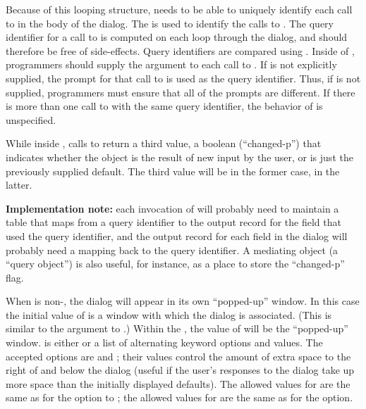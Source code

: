 Because of this looping structure,  needs to be able to
uniquely identify each call to  in the body of the dialog.  The
 is used to identify the calls to .  The
query identifier for a call to  is computed on each loop through the
dialog, and should therefore be free of side-effects.  Query identifiers are
compared using .  Inside of , programmers should
supply the  argument to each call to .  If
 is not explicitly supplied, the prompt for that call to
 is used as the query identifier.  Thus, if  is
not supplied, programmers must ensure that all of the prompts are different.  If
there is more than one call to  with the same query identifier, the
behavior of  is unspecified.  

While inside , calls to  return a third value, a
boolean (``changed-p'') that indicates whether the object is the result of new
input by the user, or is just the previously supplied default.  The third value
will be  in the former case,  in the latter.

{\bf Implementation note:} each invocation of  will
probably need to maintain a table that maps from a query identifier to the
output record for the field that used the query identifier, and the output
record for each field in the dialog will probably need a mapping back to the
query identifier.  A mediating object (a ``query object'') is also useful, for
instance, as a place to store the ``changed-p'' flag.

When  is non-, the dialog will appear in its own
``popped-up'' window.  In this case the initial value of  is a
window with which the dialog is associated.  (This is similar to the
 argument to .)  Within the ,
the value of  will be the ``popped-up'' window.   is
either  or a list of alternating keyword options and values.  The accepted
options are  and ; their values control the
amount of extra space to the right of and below the dialog (useful if the user's
responses to the dialog take up more space than the initially displayed
defaults).  The allowed values for  are the same as for the
 option to ; the allowed values for
 are the same as for the  option.


